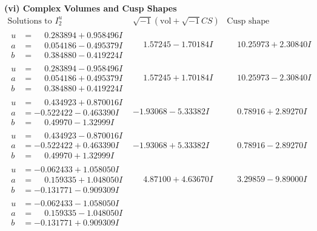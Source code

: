 \documentclass[1p]{elsarticle_modified}
\theoremstyle{definition}
\newcommand{\I}{\sqrt{-1}}
\begin{document}
\newpage\flushleft \textbf{(vi) Complex Volumes and Cusp Shapes}
$$\begin{array}{c|c|c}  
\text{Solutions to }I^u_{2}& \I (\text{vol} + \sqrt{-1}CS) & \text{Cusp shape}\\
 \hline 
\begin{aligned}
u &= \phantom{-}0.283894 + 0.958496 I \\
a &= \phantom{-}0.054186 - 0.495379 I \\
b &= \phantom{-}0.384880 - 0.419224 I\end{aligned}
 & \phantom{-}1.57245 - 1.70184 I & \phantom{-}10.25973 + 2.30840 I \\ \hline\begin{aligned}
u &= \phantom{-}0.283894 - 0.958496 I \\
a &= \phantom{-}0.054186 + 0.495379 I \\
b &= \phantom{-}0.384880 + 0.419224 I\end{aligned}
 & \phantom{-}1.57245 + 1.70184 I & \phantom{-}10.25973 - 2.30840 I \\ \hline\begin{aligned}
u &= \phantom{-}0.434923 + 0.870016 I \\
a &= -0.522422 - 0.463390 I \\
b &= \phantom{-}0.49970 - 1.32999 I\end{aligned}
 & -1.93068 - 5.33382 I & \phantom{-}0.78916 + 2.89270 I \\ \hline\begin{aligned}
u &= \phantom{-}0.434923 - 0.870016 I \\
a &= -0.522422 + 0.463390 I \\
b &= \phantom{-}0.49970 + 1.32999 I\end{aligned}
 & -1.93068 + 5.33382 I & \phantom{-}0.78916 - 2.89270 I \\ \hline\begin{aligned}
u &= -0.062433 + 1.058050 I \\
a &= \phantom{-}0.159335 + 1.048050 I \\
b &= -0.131771 - 0.909309 I\end{aligned}
 & \phantom{-}4.87100 + 4.63670 I & \phantom{-}3.29859 - 9.89000 I \\ \hline\begin{aligned}
u &= -0.062433 - 1.058050 I \\
a &= \phantom{-}0.159335 - 1.048050 I \\
b &= -0.131771 + 0.909309 I\end{aligned}

\end{array}$$
\end{document}
